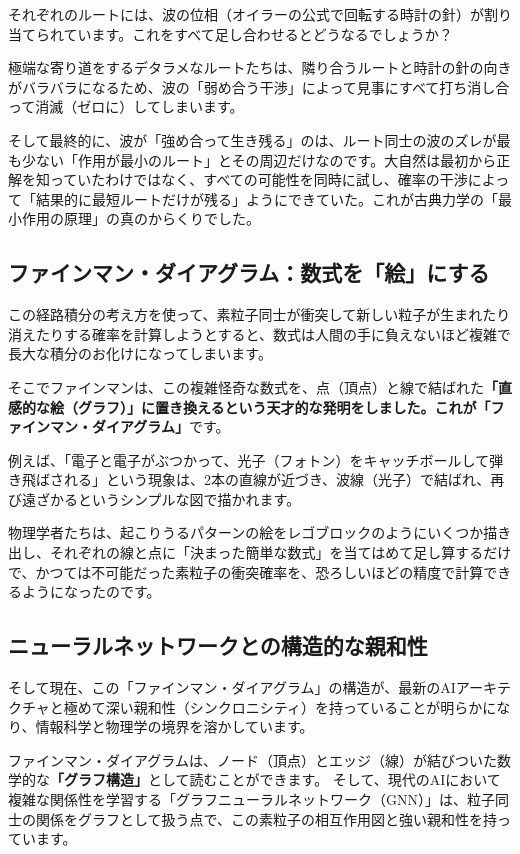 それぞれのルートには、波の位相（オイラーの公式で回転する時計の針）が割り当てられています。これをすべて足し合わせるとどうなるでしょうか？

極端な寄り道をするデタラメなルートたちは、隣り合うルートと時計の針の向きがバラバラになるため、波の「弱め合う干渉」によって見事にすべて打ち消し合って消滅（ゼロに）してしまいます。

そして最終的に、波が「強め合って生き残る」のは、ルート同士の波のズレが最も少ない「作用が最小のルート」とその周辺だけなのです。大自然は最初から正解を知っていたわけではなく、すべての可能性を同時に試し、確率の干渉によって「結果的に最短ルートだけが残る」ようにできていた。これが古典力学の「最小作用の原理」の真のからくりでした。

\subsection{ファインマン・ダイアグラム：数式を「絵」にする}

この経路積分の考え方を使って、素粒子同士が衝突して新しい粒子が生まれたり消えたりする確率を計算しようとすると、数式は人間の手に負えないほど複雑で長大な積分のお化けになってしまいます。

そこでファインマンは、この複雑怪奇な数式を、点（頂点）と線で結ばれた\textbf{「直感的な絵（グラフ）」に置き換えるという天才的な発明をしました。これが「ファインマン・ダイアグラム」}です。

例えば、「電子と電子がぶつかって、光子（フォトン）をキャッチボールして弾き飛ばされる」という現象は、2本の直線が近づき、波線（光子）で結ばれ、再び遠ざかるというシンプルな図で描かれます。

物理学者たちは、起こりうるパターンの絵をレゴブロックのようにいくつか描き出し、それぞれの線と点に「決まった簡単な数式」を当てはめて足し算するだけで、かつては不可能だった素粒子の衝突確率を、恐ろしいほどの精度で計算できるようになったのです。

\subsection{ニューラルネットワークとの構造的な親和性}

そして現在、この「ファインマン・ダイアグラム」の構造が、最新のAIアーキテクチャと極めて深い親和性（シンクロニシティ）を持っていることが明らかになり、情報科学と物理学の境界を溶かしています。

ファインマン・ダイアグラムは、ノード（頂点）とエッジ（線）が結びついた数学的な\textbf{「グラフ構造」}として読むことができます。 そして、現代のAIにおいて複雑な関係性を学習する「グラフニューラルネットワーク（GNN）」は、粒子同士の関係をグラフとして扱う点で、この素粒子の相互作用図と強い親和性を持っています。

